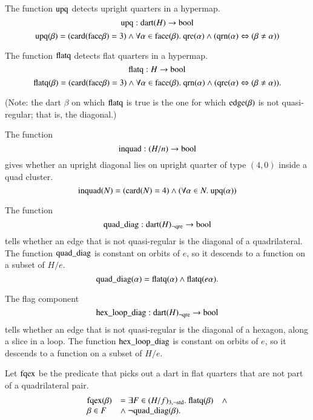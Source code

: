 \begin{definition} The function ${\operatorname{upq}}$ detects upright
quarters in a hypermap.
    $${\operatorname{upq}}:{\operatorname{dart}}(H) \to \operatorname{bool}$$
    $${\operatorname{upq}}(\beta) =  ({\operatorname{card}}({\operatorname{face}}\beta)=3)\wedge
      \forall\alpha\in {\operatorname{face}}(\beta).\
         {\operatorname{qre}}(\alpha)\wedge
         ({\operatorname{qrn}}(\alpha)\Leftrightarrow
         (\beta\ne\alpha))$$
\end{definition}

\begin{definition}
The function ${\operatorname{flatq}}$ detects flat quarters in a hypermap.
     $${\operatorname{flatq}}:H \to \operatorname{bool}$$
    $${\operatorname{flatq}}(\beta) = ({\operatorname{card}}({\operatorname{face}}\beta)=3)\wedge
       \forall\alpha\in {\operatorname{face}}(\beta).\
         {\operatorname{qrn}}(\alpha)\wedge
         ({\operatorname{qre}}(\alpha) \Leftrightarrow
         (\beta\ne\alpha)).$$
\end{definition}
(Note: the dart $\beta$ on which ${\operatorname{flatq}}$ is true is the one
for which ${\operatorname{edge}}(\beta)$ is not quasi-regular; that is, the
diagonal.)


\begin{definition}
The function
    $${\operatorname{inquad}}:(H/n)\to \operatorname{bool}$$
gives whether an upright diagonal lies on upright quarter of type
$(4,0)$ inside a quad cluster.
    $${\operatorname{inquad}}(N) =
    ({\operatorname{card}}(N)=4) \wedge (\forall \alpha\in N.\
        {\operatorname{upq}}(\alpha))
    $$
\end{definition}

\begin{definition}
The function
    $${\operatorname{quad\_diag}}:{\operatorname{dart}}(H)_{\neg{\operatorname{qre}}} \to \operatorname{bool}$$
tells whether an edge that is not quasi-regular is the diagonal of
a quadrilateral.  The function ${\operatorname{quad\_diag}}$ is constant on
orbits of $e$, so it descends to a function on a subset of $H/e$.
$$
    {\operatorname{quad\_diag}}(\alpha) = {\operatorname{flatq}}(\alpha)\wedge
    {\operatorname{flatq}}(e\alpha).
$$
\end{definition}

\begin{definition}
The flag component
    $$
    {\operatorname{hex\_loop\_diag}}:{\operatorname{dart}}(H)_{\neg{\operatorname{qre}}}\to\operatorname{bool}
    $$
tells whether an edge that is not quasi-regular is the diagonal of
a hexagon, along a slice in a loop.  The function
${\operatorname{hex\_loop\_diag}}$ is constant on orbits of $e$, so it
descends to a function on a subset of $H/e$.
\end{definition}


\begin{definition}
Let ${\operatorname{fqex}}$ be the predicate that picks out a dart in flat
quarters that are not part of a quadrilateral pair.
\begin{equation}
    \begin{array}{llll}
    \op{fqex}(\beta) &= \exists F\in(H/f)_{3,\neg\op{std}}.\ \op{flatq}(\beta) &\wedge\\
        \beta\in F &\wedge
        \ \neg\op{quad\_diag}(\beta).
    \end{array}
\end{equation}
\end{definition}




